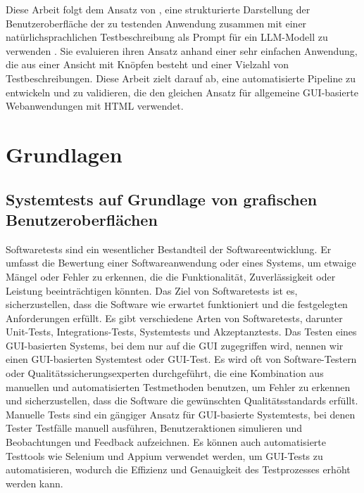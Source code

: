 Diese Arbeit folgt dem Ansatz von , eine strukturierte Darstellung der Benutzeroberfläche der zu testenden Anwendung zusammen mit einer natürlichsprachlichen Testbeschreibung als Prompt für ein LLM-Modell zu verwenden \cite{GPT3Testing}.
Sie evaluieren ihren Ansatz anhand einer sehr einfachen Anwendung, die aus einer Ansicht mit Knöpfen besteht und einer Vielzahl von Testbeschreibungen.
Diese Arbeit zielt darauf ab, eine automatisierte Pipeline zu entwickeln und zu validieren, die den gleichen Ansatz für allgemeine GUI-basierte Webanwendungen mit HTML verwendet.

\chapter{Grundlagen}
\label{ch:Foundations}

\section{Systemtests auf Grundlage von grafischen Benutzeroberflächen}
\label{sec:Foundations:GUIBasedSystemTests}
Softwaretests sind ein wesentlicher Bestandteil der Softwareentwicklung.
Er umfasst die Bewertung einer Softwareanwendung oder eines Systems, um etwaige Mängel oder Fehler zu erkennen, die die Funktionalität, Zuverlässigkeit oder Leistung beeinträchtigen könnten.
Das Ziel von Softwaretests ist es, sicherzustellen, dass die Software wie erwartet funktioniert und die festgelegten Anforderungen erfüllt.
Es gibt verschiedene Arten von Softwaretests, darunter Unit-Tests, Integrations-Tests, Systemtests und Akzeptanztests.
Das Testen eines GUI-basierten Systems, bei dem nur auf die GUI zugegriffen wird, nennen wir einen GUI-basierten Systemtest oder GUI-Test.
Es wird oft von Software-Testern oder Qualitätssicherungsexperten durchgeführt, die eine Kombination aus manuellen und automatisierten Testmethoden benutzen, um Fehler zu erkennen und sicherzustellen, dass die Software die gewünschten Qualitätsstandards erfüllt.
Manuelle Tests sind ein gängiger Ansatz für GUI-basierte Systemtests, bei denen Tester Testfälle manuell ausführen, Benutzeraktionen simulieren und Beobachtungen und Feedback aufzeichnen.
Es können auch automatisierte Testtools wie Selenium und Appium verwendet werden, um GUI-Tests zu automatisieren, wodurch die Effizienz und Genauigkeit des Testprozesses erhöht werden kann.

